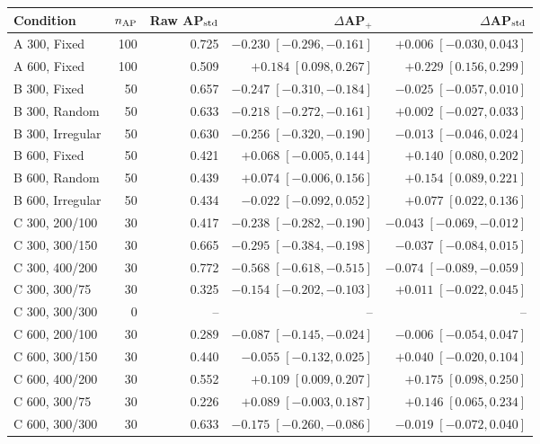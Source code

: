 \begin{tabular}{lrrrr}
\toprule
Condition & $n_{\rm AP}$ & \shortstack{Raw\\AP$_{\rm std}$} & $\Delta$AP$_+$ & $\Delta$AP$_{\rm std}$ \\
\midrule
A 300, Fixed & 100 & 0.725 & $-0.230\;[-0.296,-0.161]$ & $+0.006\;[-0.030,0.043]$ \\
A 600, Fixed & 100 & 0.509 & $+0.184\;[0.098,0.267]$ & $+0.229\;[0.156,0.299]$ \\
B 300, Fixed & 50 & 0.657 & $-0.247\;[-0.310,-0.184]$ & $-0.025\;[-0.057,0.010]$ \\
B 300, Random & 50 & 0.633 & $-0.218\;[-0.272,-0.161]$ & $+0.002\;[-0.027,0.033]$ \\
B 300, Irregular & 50 & 0.630 & $-0.256\;[-0.320,-0.190]$ & $-0.013\;[-0.046,0.024]$ \\
B 600, Fixed & 50 & 0.421 & $+0.068\;[-0.005,0.144]$ & $+0.140\;[0.080,0.202]$ \\
B 600, Random & 50 & 0.439 & $+0.074\;[-0.006,0.156]$ & $+0.154\;[0.089,0.221]$ \\
B 600, Irregular & 50 & 0.434 & $-0.022\;[-0.092,0.052]$ & $+0.077\;[0.022,0.136]$ \\
C 300, 200/100 & 30 & 0.417 & $-0.238\;[-0.282,-0.190]$ & $-0.043\;[-0.069,-0.012]$ \\
C 300, 300/150 & 30 & 0.665 & $-0.295\;[-0.384,-0.198]$ & $-0.037\;[-0.084,0.015]$ \\
C 300, 400/200 & 30 & 0.772 & $-0.568\;[-0.618,-0.515]$ & $-0.074\;[-0.089,-0.059]$ \\
C 300, 300/75 & 30 & 0.325 & $-0.154\;[-0.202,-0.103]$ & $+0.011\;[-0.022,0.045]$ \\
C 300, 300/300 & 0 & -- & -- & -- \\
C 600, 200/100 & 30 & 0.289 & $-0.087\;[-0.145,-0.024]$ & $-0.006\;[-0.054,0.047]$ \\
C 600, 300/150 & 30 & 0.440 & $-0.055\;[-0.132,0.025]$ & $+0.040\;[-0.020,0.104]$ \\
C 600, 400/200 & 30 & 0.552 & $+0.109\;[0.009,0.207]$ & $+0.175\;[0.098,0.250]$ \\
C 600, 300/75 & 30 & 0.226 & $+0.089\;[-0.003,0.187]$ & $+0.146\;[0.065,0.234]$ \\
C 600, 300/300 & 30 & 0.633 & $-0.175\;[-0.260,-0.086]$ & $-0.019\;[-0.072,0.040]$ \\
\bottomrule
\end{tabular}
